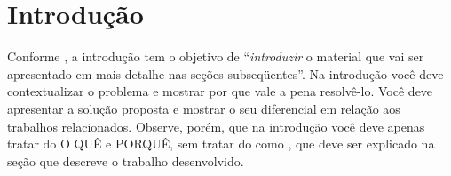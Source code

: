 \chapter{Introdução}


Conforme , a introdução tem o objetivo de ``\emph{introduzir} o material que vai ser apresentado em mais detalhe nas seções subseqüentes''. Na introdução você deve contextualizar o problema e mostrar por que vale a pena resolvê-lo. Você deve apresentar a solução proposta e mostrar o seu diferencial em relação aos trabalhos relacionados. Observe, porém, que na introdução você deve apenas tratar do O QUÊ e PORQUÊ, sem tratar do como \cite{Hexsel11}, que deve ser explicado na seção que descreve o trabalho desenvolvido.

